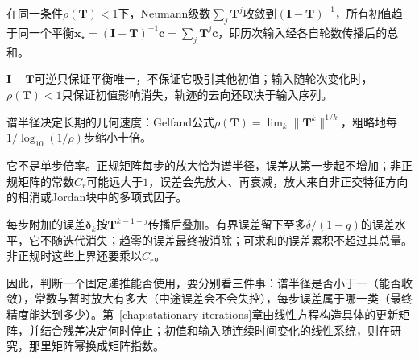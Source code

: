 在同一条件$\rho(\bm T)<1$下，Neumann级数$\sum_j\bm T^j$收敛到$(\bm I-\bm T)^{-1}$，所有初值趋于同一个平衡$\bm x_\star=(\bm I-\bm T)^{-1}\bm c=\sum_j\bm T^j\bm c$，即历次输入经各自轮数传播后的总和。

$\bm I-\bm T$可逆只保证平衡唯一，不保证它吸引其他初值；输入随轮次变化时，$\rho(\bm T)<1$只保证初值影响消失，轨迹的去向还取决于输入序列。

谱半径决定长期的几何速度：Gelfand公式$\rho(\bm T)=\lim_k\lVert\bm T^k\rVert^{1/k}$，粗略地每$1/\log_{10}(1/\rho)$步缩小十倍。

它不是单步倍率。正规矩阵每步的放大恰为谱半径，误差从第一步起不增加；非正规矩阵的常数$C_r$可能远大于$1$，误差会先放大、再衰减，放大来自非正交特征方向的相消或Jordan块中的多项式因子。

每步附加的误差$\bm\delta_k$按$\bm T^{k-1-j}$传播后叠加。有界误差留下至多$\delta/(1-q)$的误差水平，它不随迭代消失；趋零的误差最终被消除；可求和的误差累积不超过其总量。非正规时这些上界还要乘以$C_r$。

因此，判断一个固定递推能否使用，要分别看三件事：谱半径是否小于一（能否收敛），常数与暂时放大有多大（中途误差会不会失控），每步误差属于哪一类（最终精度能达到多少）。第~\ref{chap:stationary-iterations}章由线性方程构造具体的更新矩阵，并结合残差决定何时停止；初值和输入随连续时间变化的线性系统，则在研究，那里矩阵幂换成矩阵指数。
